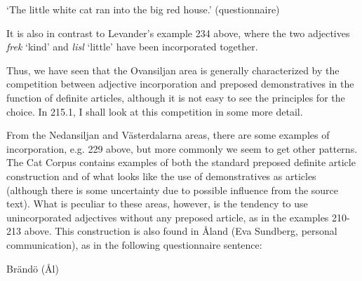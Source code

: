 \begin{styleTranslation}
‘The little white cat ran into the big red house.’ (questionnaire)

\end{styleTranslation}

\begin{styleBodyTextFirst}
It is also in contrast to Levander’s example 234 above, where the two adjectives \textit{frek} ‘kind’ and \textit{lisl} ‘little’ have been incorporated together. 

\end{styleBodyTextFirst}

\begin{styleBodytextC}
Thus, we have seen that the Ovansiljan area is generally characterized by the competition between adjective incorporation and preposed demonstratives in the function of definite articles, although it is not easy to see the principles for the choice. In 215.1, I shall look at this competition in some more detail.

\end{styleBodytextC}

\begin{styleBodytextC}
From the Nedansiljan and Västerdalarna areas, there are some examples of incorporation, e.g. 229 above, but more commonly we seem to get other patterns. The Cat Corpus contains examples of both the standard preposed definite article construction and of what looks like the use of demonstratives as articles (although there is some uncertainty due to possible influence from the source text). What is peculiar to these areas, however, is the tendency to use unincorporated adjectives without any preposed article, as in the examples 210{}-213 above. This construction is also found in Åland (Eva Sundberg, personal communication), as in the following questionnaire sentence:

\end{styleBodytextC}

\begin{listWWNumileveli}
\item 

\begin{styleExample}
Brändö (Ål)

\end{styleExample}

\end{listWWNumileveli}

